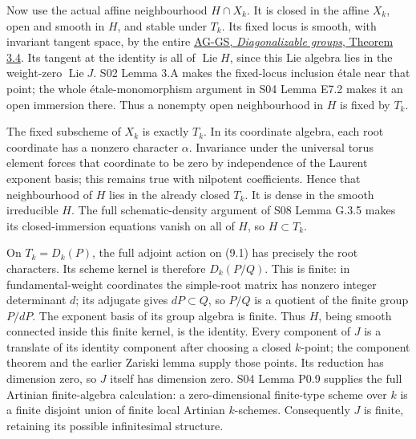 \documentclass[11pt,a4paper,openany]{report}
\newcounter{none}
\begin{document}
Now use the actual affine neighbourhood \(H\cap X_k\). It is closed in the affine \(X_k\), open and smooth in \(H\), and stable under \(T_k\). Its fixed locus is smooth, with invariant tangent space, by the entire \href{https://github.com/KokunoYumeto/open-math-courses/blob/d02d0a3669f42579db037cd44de1d113fdd770a1/docs/courses/AG-GS/src/diagonalizable-groups.md}{AG-GS, \emph{Diagonalizable groups}, Theorem 3.4}. Its tangent at the identity is all of \(\operatorname{Lie}H\), since this Lie algebra lies in the weight-zero \(\operatorname{Lie}J\). S02 Lemma 3.A makes the fixed-locus inclusion étale near that point; the whole étale-monomorphism argument in S04 Lemma E7.2 makes it an open immersion there. Thus a nonempty open neighbourhood in \(H\) is fixed by \(T_k\).

The fixed subscheme of \(X_k\) is exactly \(T_k\). In its coordinate algebra, each root coordinate has a nonzero character \(\alpha\). Invariance under the universal torus element forces that coordinate to be zero by independence of the Laurent exponent basis; this remains true with nilpotent coefficients. Hence that neighbourhood of \(H\) lies in the already closed \(T_k\). It is dense in the smooth irreducible \(H\). The full schematic-density argument of S08 Lemma G.3.5 makes its closed-immersion equations vanish on all of \(H\), so \(H\subset T_k\).

On \(T_k=D_k(P)\), the full adjoint action on (9.1) has precisely the root characters. Its scheme kernel is therefore \(D_k(P/Q)\). This is finite: in fundamental-weight coordinates the simple-root matrix has nonzero integer determinant \(d\); its adjugate gives \(dP\subset Q\), so \(P/Q\) is a quotient of the finite group \(P/dP\). The exponent basis of its group algebra is finite. Thus \(H\), being smooth connected inside this finite kernel, is the identity. Every component of \(J\) is a translate of its identity component after choosing a closed \(k\)-point; the component theorem and the earlier Zariski lemma supply those points. Its reduction has dimension zero, so \(J\) itself has dimension zero. S04 Lemma P0.9 supplies the full Artinian finite-algebra calculation: a zero-dimensional finite-type scheme over \(k\) is a finite disjoint union of finite local Artinian \(k\)-schemes. Consequently \(J\) is finite, retaining its possible infinitesimal structure.
\end{document}
